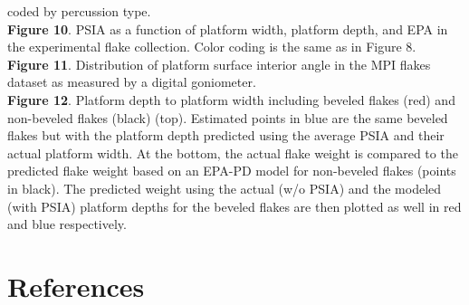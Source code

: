 \documentclass[10pt,letterpaper]{article}
\begin{document}
coded by percussion type.\\
\textbf{Figure 10}. PSIA as a function of platform width, platform
depth, and EPA in the experimental flake collection. Color coding is the
same as in Figure 8.\\
\textbf{Figure 11}. Distribution of platform surface interior angle in
the MPI flakes dataset as measured by a digital goniometer.\\
\textbf{Figure 12}. Platform depth to platform width including beveled
flakes (red) and non-beveled flakes (black) (top). Estimated points in
blue are the same beveled flakes but with the platform depth predicted
using the average PSIA and their actual platform width. At the bottom,
the actual flake weight is compared to the predicted flake weight based
on an EPA-PD model for non-beveled flakes (points in black). The
predicted weight using the actual (w/o PSIA) and the modeled (with PSIA)
platform depths for the beveled flakes are then plotted as well in red
and blue respectively.

\hypertarget{references}{%
\section*{References}\label{references}}
\end{document}
